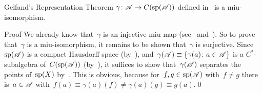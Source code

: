 \documentclass[a]{subfiles}
\begin{document}
\begin{parsec}
\begin{point}[gelfand]{Gelfand's Representation Theorem}
 $\gamma\colon \mathscr{A}\to C(\mathrm{sp}(\mathscr{A}))$
defined in~
is a miu-isomorphism.
\begin{point}{Proof}%
We already know that~$\gamma$ is an injective miu-map
(see~ 
and~).
So to prove that~$\gamma$ is a miu-isomorphism,
it remains to be shown that~$\gamma$ is surjective.
Since~$\mathrm{sp}(\mathscr{A})$ is a compact Hausdorff space 
(by~),
and~$\gamma(\mathscr{A})\equiv \{\gamma(a)\colon a\in \mathscr{A}\}$
is a $C^*$-subalgebra of~$C(\mathrm{sp}(\mathscr{A}))$
(by~),
it suffices to show that~$\gamma(\mathscr{A})$
separates the points of~$\mathrm{sp}(X)$
by~.
This is obvious,
because
for~$f,g\in \mathrm{sp}(\mathscr{A})$ with~$f\neq g$
there is~$a\in \mathscr{A}$ with~$f(a)\equiv \gamma(a)(f)
\neq \gamma(a)(g)\equiv g(a)$.\qed
\end{point}
\end{point}
\end{parsec}
\end{document}
